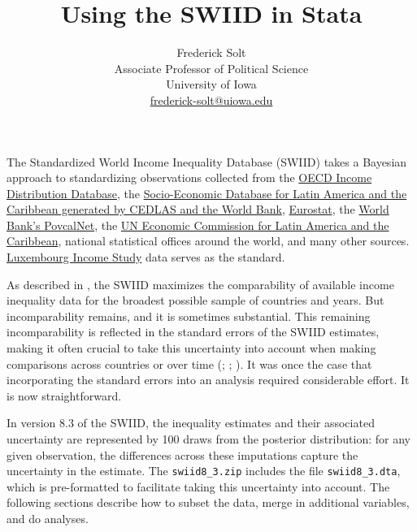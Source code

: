 \documentclass[11pt]{article}
\begin{document}
\title{Using the SWIID in Stata}
\author{
Frederick Solt\\
  Associate Professor of Political Science\\
  University of Iowa\\
  \href{mailto:frederick-solt@uiowa.edu}{frederick-solt@uiowa.edu}}
\date{}
\maketitle 

The Standardized World Income Inequality Database (SWIID) takes a Bayesian approach to standardizing observations collected from the \href{http://www.oecd.org/social/inequality.htm}{OECD Income Distribution Database}, the \href{http://sedlac.econo.unlp.edu.ar/eng/}{Socio-Economic Database for Latin America and the Caribbean generated by CEDLAS and the World Bank}, \href{http://epp.eurostat.ec.europa.eu}{Eurostat}, the \href{http://iresearch.worldbank.org/PovcalNet/index.htm}{World Bank's PovcalNet}, the \href{http://interwp.cepal.org/sisgen/ConsultaIntegrada.asp?idIndicador=250\&idioma=e}{UN Economic Commission for Latin America and the Caribbean}, national statistical offices around the world, and many other sources.  \href{http://www.lisdatacenter.org}{Luxembourg Income Study} data serves as the standard.  

As described in \citet{Solt2020}, the SWIID maximizes the comparability of available income inequality data for the broadest possible sample of countries and years.  But incomparability remains, and it is sometimes substantial.  This remaining incomparability is reflected in the standard errors of the SWIID estimates, making it often crucial to take this uncertainty into account when making comparisons across countries or over time (\citealt[238]{Solt2009}; \citealt[14]{Solt2016_nv}; \citealt{Solt2020}).  It was once the case that incorporating the standard errors into an analysis required considerable effort.  It is now straightforward.

In version 8.3 of the SWIID, the inequality estimates and their associated uncertainty are represented by 100 draws from the posterior
distribution: for any given observation, the differences across these imputations capture the uncertainty in the estimate.  The \verb+swiid8_3.zip+ includes the file \verb+swiid8_3.dta+, which is pre-formatted to facilitate taking this uncertainty into account.  The following sections describe how to subset the data, merge in additional variables, and do analyses.
\end{document}
